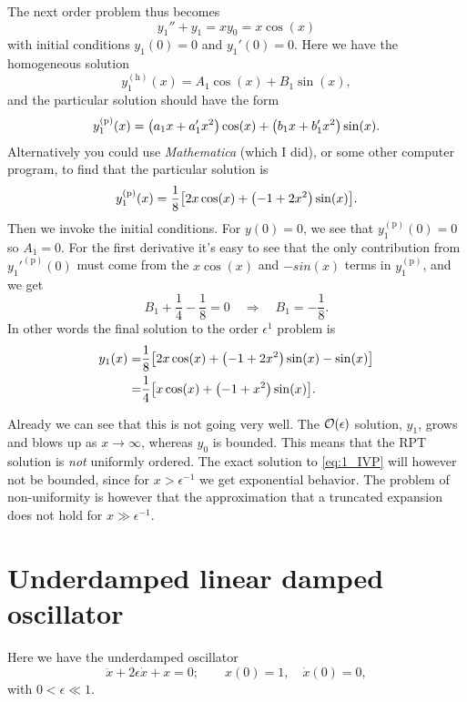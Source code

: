 \documentclass[11pt,letter, swedish, english
]{article}
\begin{document}
The next order problem thus becomes
\begin{equation}
y_1''+y_1=xy_0=x\cos(x)
\end{equation}
with initial conditions $y_1(0)=0$ and $y_1'(0)=0$. Here we have the
homogeneous solution
\begin{equation}
y_1^{(\text{h})}(x)=A_1\cos(x)+B_1\sin(x),
\end{equation}
and the particular solution should have the form
\begin{equation}
y_1^{(\text{p})}(x)=\qty(a_1x+a_1'x^2)\cos(x)+\qty(b_1x+b_1'x^2)\sin(x).
\end{equation}
Alternatively you could use \textit{Mathematica} (which I did), or
some other computer program, to find that the particular solution is 
\begin{equation}
y_1^{(\text{p})}(x)=\frac{1}{8}\qty[
2x\cos(x)+\qty(-1+2x^2)\sin(x)].
\end{equation}
Then we invoke the initial conditions. For $y(0)=0$, we see that
$y_1^{(\text{p})}(0)=0$ so $A_1=0$. For the first derivative it's easy
to see that the only contribution from ${y_1'}^{(\text{p})}(0)$ must
come from the $x\cos(x)$ and $-sin(x)$ terms in $y_1^{(\text{p})}$,
and we get
\begin{equation}
B_1+\frac{1}{4}-\frac{1}{8}=0
\quad\Longrightarrow\quad
B_1=-\frac{1}{8}.
\end{equation}
In other words the final solution to the order $\epsilon^1$ problem is
\begin{equation}
\begin{aligned}
y_1(x)=&\frac{1}{8}\qty[2x\cos(x)+\qty(-1+2x^2)\sin(x)-\sin(x)]\\
=&\frac{1}{4}\qty[x\cos(x)+\qty(-1+x^2)\sin(x)].
\end{aligned}
\end{equation}

Already we can see that this is not going very well. The
$\order{\epsilon}$ solution, $y_1$, grows and blows up as
$x\to\infty$, whereas $y_0$ is bounded. This means that the RPT
solution is \emph{not} uniformly ordered. The exact solution to
\eqref{eq:1_IVP} will however not be bounded, since for
$x>\epsilon^{-1}$ we get exponential behavior. The problem of
non-uniformity is however that the approximation that a truncated
expansion does not hold for $x\gg\epsilon^{-1}$. 






\section{Underdamped linear damped oscillator}
Here we have the underdamped oscillator
\begin{equation}
\ddot{x}+2\epsilon\dot{x}+x=0;\qquad
x(0)=1,\quad \dot{x}(0)=0,
\end{equation}
with $0<\epsilon\ll1$.
\end{document}
